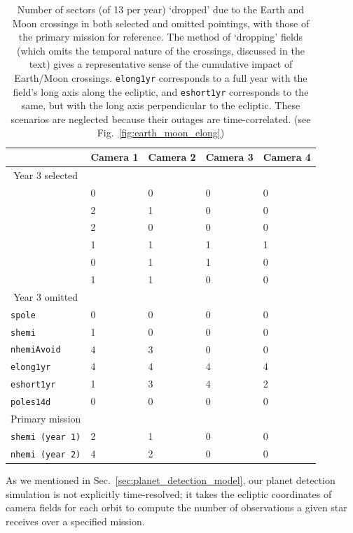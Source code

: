 \begin{table}[!t]
	\centering
	\begin{tabular}{ | l | l | l | l | l | }
		\hline
		\ & Camera 1 & Camera 2 & Camera 3 & Camera 4 \\ \hline
		\multicolumn{1}{|c|}{Year 3 selected} & \  & \  & \  & \  \\ \hline
		\npole & 0 & 0 & 0 & 0 \\ \hline
		\nhemi & 2 & 1 & 0 & 0 \\ \hline
		\shemiAvoid & 2 & 0 & 0 & 0 \\ \hline
		\elong & 1 & 1 & 1 & 1 \\ \hline
		\eshort & 0 & 1 & 1 & 0 \\ \hline
		\hemis & 1 & 1 & 0 & 0 \\ \hline
		\multicolumn{1}{|c|}{Year 3 omitted} & \  & \  & \  & \  \\ \hline
		\texttt{spole}  & 0 & 0 & 0 & 0 \\ \hline
		\texttt{shemi} & 1 & 0 & 0 & 0 \\ \hline
		\texttt{nhemiAvoid} & 4 & 3 & 0 & 0 \\ \hline
		\texttt{elong1yr} & 4 & 4 & 4 & 4 \\ \hline
		\texttt{eshort1yr} & 1 & 3 & 4 & 2 \\ \hline
		\texttt{poles14d} & 0 & 0 & 0 & 0 \\ \hline
		\multicolumn{1}{|c|}{Primary mission} & \  & \  & \  & \  \\ \hline
		\texttt{shemi (year 1)} & 2 & 1 & 0 & 0 \\ \hline
		\texttt{nhemi (year 2)} & 4 & 2 & 0 & 0 \\ \hline
	\end{tabular}
	\caption{Number of sectors (of 13 per year) `dropped' due to the Earth and Moon crossings in both selected and omitted pointings, with those of the primary mission for reference. The method of `dropping' fields (which omits the temporal nature of the crossings, discussed in the text) gives a representative sense of the cumulative impact of Earth/Moon crossings. \texttt{elong1yr} corresponds to a full year with the \tess field's long axis along the ecliptic, and \texttt{eshort1yr} corresponds to the same, but with the long axis perpendicular to the ecliptic. These scenarios are neglected because their outages are time-correlated. (see Fig.~\protect\ref{fig:earth_moon_elong})}
	\label{tab:dropped_fields}
\end{table}
As we mentioned in Sec.~\ref{sec:planet_detection_model}, our planet detection simulation is not explicitly time-resolved; it takes the ecliptic coordinates of camera fields for each orbit to compute the number of observations a given star receives over a specified mission.
